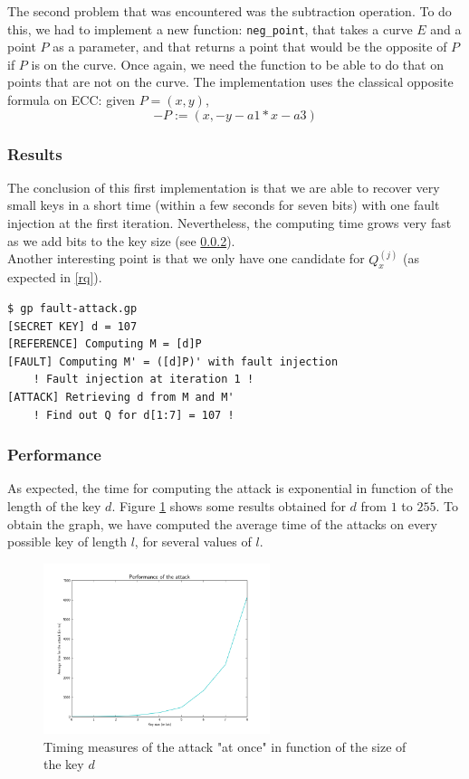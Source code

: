 \documentclass[journal]{IEEEtran}
\begin{document}
The second problem that was encountered was the subtraction operation. To do this, we had to implement a new function: {\tt neg\_point}, that takes a curve $E$ and a point $P$ as a parameter, and that returns a point that would be the
opposite of $P$ if $P$ is on the curve. Once again, we need the function to be able to do that on points that are not on the curve. The implementation uses the classical opposite formula on ECC: given $P = (x, y)$,
$$- P := (x, -y - a1*x - a3)$$

\subsubsection{Results}
The conclusion of this first implementation is that we are able to recover very small keys in a short time (within a few seconds for seven bits) with one fault injection at the first iteration.
Nevertheless, the computing time grows very fast as we add bits to the key size (see \ref{perf-all}).\\
Another interesting point is that we only have one candidate for $Q_x^{(j)}$ (as expected in \ref{rq}).

\begin{footnotesize}
\begin{verbatim}
$ gp fault-attack.gp 
[SECRET KEY] d = 107
[REFERENCE] Computing M = [d]P
[FAULT] Computing M' = ([d]P)' with fault injection
    ! Fault injection at iteration 1 !
[ATTACK] Retrieving d from M and M'
    ! Find out Q for d[1:7] = 107 !
\end{verbatim}
\end{footnotesize}

\subsubsection{Performance}
\label{perf-all}
As expected, the time for computing the attack is exponential in function of the length of the key $d$. Figure \ref{first-attack-perf} shows some results obtained for $d$ from $1$ to $255$. 
To obtain the graph, we have computed the average time of the attacks on every possible key of length $l$, for several values of $l$.

\begin{figure}
    \centering
    \includegraphics[width=250px]{img/first-attack-perf.png}
    \caption{Timing measures of the attack "at once" in function of the size of the key $d$}
    \label{first-attack-perf}
\end{figure}   
\end{document}

